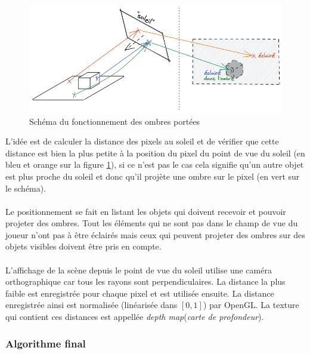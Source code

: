 \documentclass[11pt]{article} %
\begin{document}
\begin{figure}[h]
	\centering
	\includegraphics[scale=.49]{ombres}
	\caption{Schéma du fonctionnement des ombres portées}
	\label{fig:shadows_schema}
\end{figure}

L'idée est de calculer la distance des pixels au soleil et de vérifier que cette distance est bien la plus petite à la position du pixel du point de vue du soleil (en bleu et orange sur la figure \ref{fig:shadows_schema}), si ce n'est pas le cas cela signifie qu'un autre objet est plus proche du soleil et donc qu'il projète une ombre sur le pixel (en vert sur le schéma).

\paragraph{}
Le positionnement se fait en listant les objets qui doivent recevoir et pouvoir projeter des ombres. Tout les éléments qui ne sont pas dans le champ de vue du joueur n'ont pas à être éclairés mais ceux qui peuvent projeter des ombres sur des objets visibles doivent être pris en compte.
\paragraph{}
L'affichage de la scène depuis le point de vue du soleil utilise une caméra orthographique car tous les rayons sont perpendiculaires. La distance la plus faible est enregistrée pour chaque pixel et est utilisée ensuite. La distance enregistrée ainsi est normalisée (linéarisée dans $[0,1]$) par OpenGL. La texture qui contient ces distances est appellée \textit{depth map}(\textit{carte de profondeur}).

\subsubsection{Algorithme final}
\end{document}
